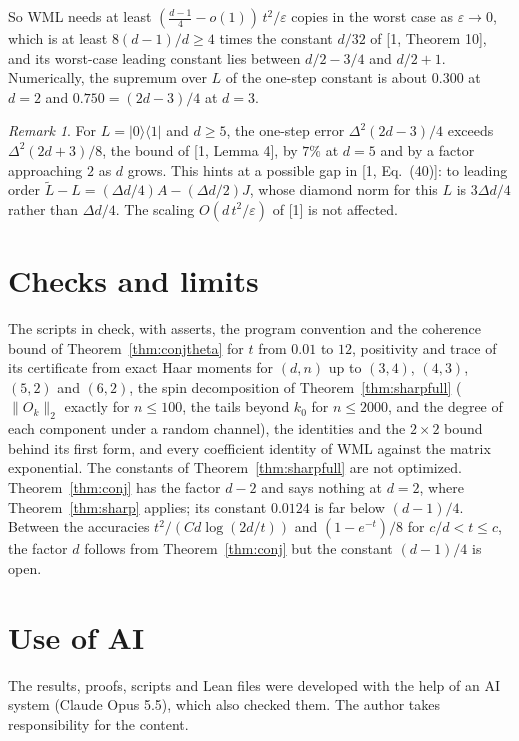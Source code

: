 \documentclass[11pt]{article}
\theoremstyle{remark}
\newtheorem{remark}[theorem]{Remark}
\newcommand{\ket}[1]{\lvert #1 \rangle}
\newcommand{\bra}[1]{\langle #1 \rvert}
\begin{document}
So WML needs at least $(\tfrac{d-1}{4} - o(1))\,t^2/\varepsilon$ copies in the worst case as $\varepsilon \to 0$, which is at least $8(d-1)/d \ge 4$ times the constant $d/32$ of [1, Theorem 10], and its worst-case leading constant lies between $d/2 - 3/4$ and $d/2 + 1$. Numerically, the supremum over $L$ of the one-step constant is about $0.300$ at $d = 2$ and $0.750 = (2d-3)/4$ at $d = 3$.

\begin{remark}\label{rem:gap}
For $L = \ket{0}\bra{1}$ and $d \ge 5$, the one-step error $\Delta^2(2d-3)/4$ exceeds $\Delta^2(2d+3)/8$, the bound of [1, Lemma 4], by $7\%$ at $d = 5$ and by a factor approaching $2$ as $d$ grows. This hints at a possible gap in [1, Eq.~(40)]: to leading order $\tilde L - L = (\Delta d/4)A - (\Delta d/2)J$, whose diamond norm for this $L$ is $3\Delta d/4$ rather than $\Delta d/4$. The scaling $O(d\,t^2/\varepsilon)$ of [1] is not affected.
\end{remark}

\section{Checks and limits}

The scripts in  check, with asserts, the program convention and the coherence bound of Theorem~\ref{thm:conjtheta} for $t$ from $0.01$ to $12$, positivity and trace of its certificate from exact Haar moments for $(d,n)$ up to $(3,4)$, $(4,3)$, $(5,2)$ and $(6,2)$, the spin decomposition of Theorem~\ref{thm:sharpfull} ($\lVert O_k\rVert_2$ exactly for $n \le 100$, the tails beyond $k_0$ for $n \le 2000$, and the degree of each component under a random channel), the identities and the $2\times 2$ bound behind its first form, and every coefficient identity of WML against the matrix exponential. The constants of Theorem~\ref{thm:sharpfull} are not optimized. Theorem~\ref{thm:conj} has the factor $d-2$ and says nothing at $d = 2$, where Theorem~\ref{thm:sharp} applies; its constant $0.0124$ is far below $(d-1)/4$. Between the accuracies $t^2/(Cd\log(2d/t))$ and $(1-e^{-t})/8$ for $c/d < t \le c$, the factor $d$ follows from Theorem~\ref{thm:conj} but the constant $(d-1)/4$ is open.

\section*{Use of AI}
The results, proofs, scripts and Lean files were developed with the help of an AI system (Claude Opus 5.5), which also checked them. The author takes responsibility for the content.
\end{document}
